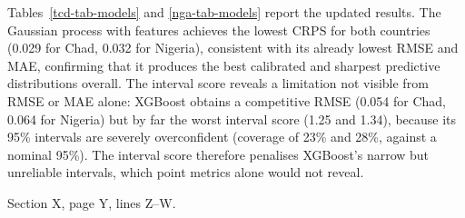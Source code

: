 \begin{response}
Tables~\ref{tcd-tab-models} and \ref{nga-tab-models} report the updated results. The Gaussian process with features achieves the lowest CRPS for both countries (0.029 for Chad, 0.032 for Nigeria), consistent with its already lowest RMSE and MAE, confirming that it produces the best calibrated and sharpest predictive distributions overall. The interval score reveals a limitation not visible from RMSE or MAE alone: XGBoost obtains a competitive RMSE (0.054 for Chad, 0.064 for Nigeria) but by far the worst interval score (1.25 and 1.34), because its 95\% intervals are severely overconfident (coverage of 23\% and 28\%, against a nominal 95\%). The interval score therefore penalises XGBoost's narrow but unreliable intervals, which point metrics alone would not reveal.
\end{response}
\begin{change}
Section X, page Y, lines Z--W.
\end{change}
